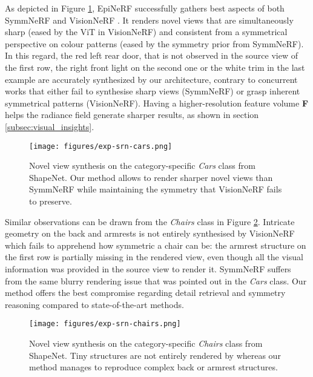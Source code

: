 As depicted in Figure \ref{fig:exp-srn-car}, EpiNeRF successfully gathers best aspects of both SymmNeRF \cite{symmnerf} and VisionNeRF \cite{visionnerf}. It renders novel views that are simultaneously sharp (eased by the ViT in VisionNeRF) and consistent from a symmetrical perspective on colour patterns (eased by the symmetry prior from SymmNeRF). In this regard, the red left rear door, that is not observed in the source view of the first row,  the right front light on the second one or the white trim in the last example are accurately synthesized by our architecture, contrary to concurrent works that either fail to synthesise sharp views (SymmNeRF) or grasp inherent symmetrical patterns (VisionNeRF). Having a higher-resolution feature volume \textbf{F} helps the radiance field generate sharper results, as shown in section \ref{subsec:visual_insights}. 

\begin{figure}[htb!]
    \center
  \texttt{[image: figures/exp-srn-cars.png]}
  \caption{Novel view synthesis on the category-specific \textit{Cars} class from ShapeNet. Our method allows to render sharper novel views than SymmNeRF \cite{symmnerf} while maintaining the symmetry that VisionNeRF \cite{visionnerf} fails to preserve.}
  \label{fig:exp-srn-car}
\end{figure}

 Similar observations can be drawn from the \textit{Chairs} class in Figure \ref{fig:exp-srn-chair}. Intricate geometry on the back and armrests is not entirely synthesised by VisionNeRF  which fails to apprehend how symmetric a chair can be: the armrest structure on the first row is partially missing in the rendered view, even though all the visual information was provided in the source view to render it. SymmNeRF suffers from the same blurry rendering issue that was pointed out in the \textit{Cars} class. Our method offers the best compromise regarding detail retrieval and symmetry reasoning compared to state-of-the-art methods.
 
\begin{figure}[htb!]
    \center
  \texttt{[image: figures/exp-srn-chairs.png]}
  \caption{Novel view synthesis on the category-specific \textit{Chairs} class from ShapeNet. Tiny structures are not entirely rendered by \cite{visionnerf,symmnerf} whereas our method manages to reproduce complex back or armrest structures.}
  \label{fig:exp-srn-chair}
\end{figure}

